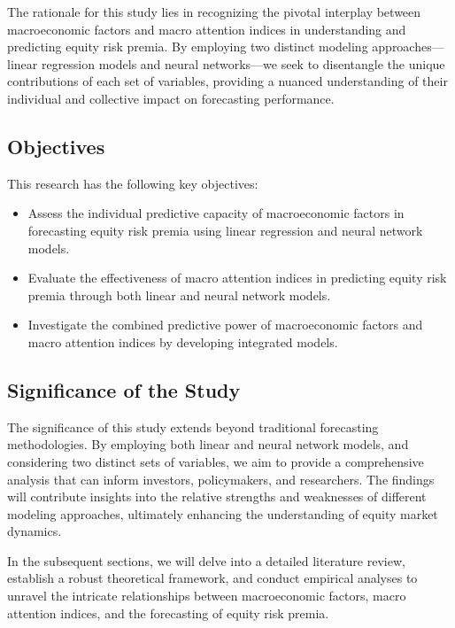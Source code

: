 \documentclass{article}
\begin{document}
The rationale for this study lies in recognizing the pivotal interplay between macroeconomic factors and macro attention indices in understanding and predicting equity risk premia. By employing two distinct modeling approaches—linear regression models and neural networks—we seek to disentangle the unique contributions of each set of variables, providing a nuanced understanding of their individual and collective impact on forecasting performance.

\subsection{Objectives}

This research has the following key objectives:
\begin{itemize}
  \item Assess the individual predictive capacity of macroeconomic factors in forecasting equity risk premia using linear regression and neural network models.
  \item Evaluate the effectiveness of macro attention indices in predicting equity risk premia through both linear and neural network models.
  \item Investigate the combined predictive power of macroeconomic factors and macro attention indices by developing integrated models.
\end{itemize}

\subsection{Significance of the Study}

The significance of this study extends beyond traditional forecasting methodologies. By employing both linear and neural network models, and considering two distinct sets of variables, we aim to provide a comprehensive analysis that can inform investors, policymakers, and researchers. The findings will contribute insights into the relative strengths and weaknesses of different modeling approaches, ultimately enhancing the understanding of equity market dynamics.

In the subsequent sections, we will delve into a detailed literature review, establish a robust theoretical framework, and conduct empirical analyses to unravel the intricate relationships between macroeconomic factors, macro attention indices, and the forecasting of equity risk premia.

\newpage
\end{document}
